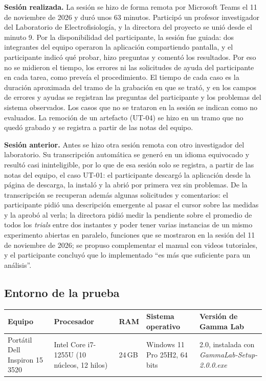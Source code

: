 \documentclass[12pt,letterpaper,oneside]{article}
\DeclareRobustCommand{\_}{\textunderscore\allowbreak}
\newcommand{\fechasesion}{11 de noviembre de 2026}
\begin{document}
\textbf{Sesión realizada.} La sesión se hizo de forma remota por Microsoft Teams el \fechasesion{} y duró unos 63 minutos. Participó un profesor investigador del Laboratorio de Electrofisiología, y la directora del proyecto se unió desde el minuto 9. Por la disponibilidad del participante, la sesión fue guiada: dos integrantes del equipo operaron la aplicación compartiendo pantalla, y el participante indicó qué probar, hizo preguntas y comentó los resultados. Por eso no se midieron el tiempo, los errores ni las solicitudes de ayuda del participante en cada tarea, como preveía el procedimiento. El tiempo de cada caso es la duración aproximada del tramo de la grabación en que se trató, y en los campos de errores y ayudas se registran las preguntas del participante y los problemas del sistema observados. Los casos que no se trataron en la sesión se indican como no evaluados. La remoción de un artefacto (UT-04) se hizo en un tramo que no quedó grabado y se registra a partir de las notas del equipo.

\textbf{Sesión anterior.} Antes se hizo otra sesión remota con otro investigador del laboratorio. Su transcripción automática se generó en un idioma equivocado y resultó casi ininteligible, por lo que de esa sesión solo se registra, a partir de las notas del equipo, el caso UT-01: el participante descargó la aplicación desde la página de descarga, la instaló y la abrió por primera vez sin problemas. De la transcripción se recuperan además algunas solicitudes y comentarios: el participante pidió una descripción emergente al pasar el cursor sobre las medidas y la aprobó al verla; la directora pidió medir la pendiente sobre el promedio de todos los \textit{trials} entre dos instantes y poder tener varias instancias de un mismo experimento abiertas en paralelo, funciones que se mostraron en la sesión del \fechasesion{}; se propuso complementar el manual con videos tutoriales, y el participante concluyó que lo implementado ``es más que suficiente para un análisis''.

\subsection{Entorno de la prueba}

\begin{center}
\small
\begin{tabularx}{\textwidth}{|X|X|X|X|X|}
\hline
\textbf{Equipo} & \textbf{Procesador} & \textbf{RAM} & \textbf{Sistema operativo} & \textbf{Versión de Gamma Lab} \\
\hline
Portátil Dell Inspiron 15 3520 & Intel Core i7-1255U (10 núcleos, 12 hilos) & 24\,GB & Windows 11 Pro 25H2, 64 bits & 2.0, instalada con \textit{GammaLab-Setup-2.0.0.exe} \\
\hline
\end{tabularx}
\label{tab:td_ut_entorno}
\end{center}
\end{document}
